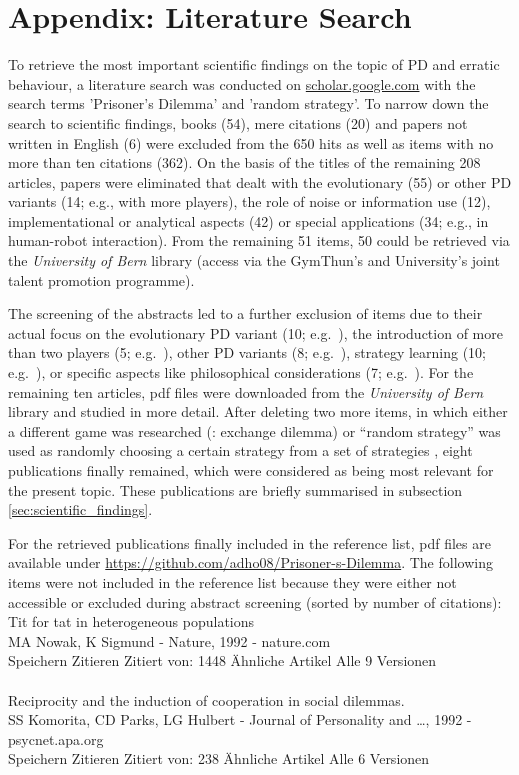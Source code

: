 \documentclass[11pt]{article}
\begin{document}
\section{Appendix: Literature Search} \label{sec:appendices}
To retrieve the most important scientific findings on the topic of PD and erratic behaviour, a literature search was conducted on \url{scholar.google.com} with the search terms 'Prisoner's Dilemma' and 'random strategy'. 
To narrow down the search to scientific findings, books (54), mere citations (20) and papers not written in English (6) were excluded from the 650 hits as well as items with no more than ten citations (362).
On the basis of the titles of the remaining 208 articles, papers were eliminated that dealt with the evolutionary (55) or other PD variants (14; e.g., with more players), the role of noise or information use (12), implementational or analytical aspects (42) or special applications (34; e.g., in human-robot interaction). 
From the remaining 51 items, 50 could be retrieved via the \textit{University of Bern} library (access via the GymThun's and University’s joint talent promotion programme). 

The screening of the abstracts led to a further exclusion of items due to their actual focus on the evolutionary PD variant (10; e.g.~\cite{SSLP09}), the introduction of more than two players (5; e.g.~\cite{IGP04}), other PD variants (8; e.g.~\cite{HY98}), strategy learning (10; e.g.~\cite{HZX22}), or specific aspects like philosophical considerations (7; e.g.~\cite{McL81}). 
For the remaining ten articles, pdf files were downloaded from the \textit{University of Bern} library and studied in more detail.
After deleting two more items, in which either a different game was researched (\cite{BF06}: exchange dilemma) or “random strategy” was used as randomly choosing a certain strategy from a set of strategies \cite{CF23}, eight publications finally remained, which were considered as being most relevant for the present topic.
These publications are briefly summarised in subsection \ref{sec:scientific_findings}.

For the retrieved publications finally included in the reference list, pdf files are available under \url{https://github.com/adho08/Prisoner-s-Dilemma}.
The following items were not included in the reference list because they were either not accessible or excluded during abstract screening (sorted by number of citations):\\

\noindent 
Tit for tat in heterogeneous populations\\
MA Nowak, K Sigmund - Nature, 1992 - nature.com\\
Speichern Zitieren Zitiert von: 1448 Ähnliche Artikel Alle 9 Versionen\\
\\
\noindent 
Reciprocity and the induction of cooperation in social dilemmas.\\
SS Komorita, CD Parks, LG Hulbert - Journal of Personality and …, 1992 - psycnet.apa.org\\
Speichern Zitieren Zitiert von: 238 Ähnliche Artikel Alle 6 Versionen\\
\end{document}
